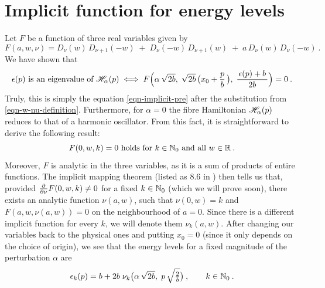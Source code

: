 \section{Implicit function for energy levels} \label{section-dirac-implicit-function}
Let $F$ be a function of three real variables given by
\begin{equation*}
    F(a, w, \nu) =
    D_\nu(w) \, D_{\nu+1}(-w)
    \;+\; D_\nu(-w) \, D_{\nu+1}(w)
    \;+\; a \, D_\nu(w) \, D_\nu(-w)
    \: .
\end{equation*}
We have shown that
\begin{align*}
    \epsilon(p) \text{ is an eigenvalue of } \mathscr{H}_\alpha(p)
    \; \Longleftrightarrow \;
    F\Big(
        \alpha \, \sqrt{2b}, \;
        \sqrt{2b} \, \big( x_0 + \frac{p}{b} \, \big), \;
        \frac{\, \epsilon(p) + b \,}{2b}
    \Big) = 0 \: .
\end{align*}
Truly, this is simply the equation \eqref{eqn-implicit-pre} after the substitution from \eqref{eqn-w-nu-definition}. Furthermore, for $\alpha = 0$ the fibre Hamiltonian $\mathscr{H}_\alpha(p)$ reduces to that of a harmonic oscillator. From this fact, it is straightforward to derive the following result:
\begin{equation*}
    F(0, w, k) = 0
    \text{ holds for }
    k \in \mathbb{N}_0
    \text{ and all }
    w \in \mathbb{R}
    \: .
\end{equation*}
Moreover, $F$ is analytic in the three variables, as it is a sum of products of entire functions. The implicit mapping theorem (listed as 8.6 in \cite{KaupKaup1983}) then tells us that, provided $\frac{\partial }{\partial \nu} F(0, w, k) \neq 0$ for a fixed $k \in \mathbb{N}_0$ (which we will prove soon), there exists an analytic function $\nu(a, w)$, such that $\nu(0,w) = k$ and $F(a, w, \nu(a,w)) = 0$ on the neighbourhood of $a=0$. Since there is a different implicit function for every $k$, we will denote them $\nu_k(a,w)$. After changing our variables back to the physical ones and putting $x_0=0$ (since it only depends on the choice of origin), we see that the energy levels for a fixed magnitude of the perturbation $\alpha$ are
\begin{equation*}
    \epsilon_k(p) = b + 2b\;\nu_k\big( \alpha \, \sqrt{2b}, \; p \, \sqrt{\tfrac{2}{b}}  \big) \: ,
    \qquad k \in \mathbb{N}_0 \: .
\end{equation*}

